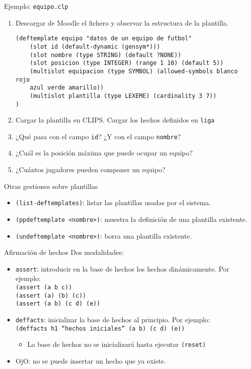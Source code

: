 \documentclass[usenames,dvipsnames,aspectratio=169]{beamer}
\begin{document}
\begin{frame}[fragile]{Ejemplo: \texttt{equipo.clp}}
	\begin{enumerate}
		\item Descargar de Moodle el fichero y observar la estructura de la plantilla.
\begin{verbatim}
(deftemplate equipo "datos de un equipo de futbol"
    (slot id (default-dynamic (gensym*)))
    (slot nombre (type STRING) (default ?NONE))
    (slot posicion (type INTEGER) (range 1 10) (default 5))
    (multislot equipacion (type SYMBOL) (allowed-symbols blanco rojo
    azul verde amarillo))
    (multislot plantilla (type LEXEME) (cardinality 3 7))
)
\end{verbatim}
		\item Cargar la plantilla en CLIPS. Cargar los hechos definidos en \texttt{liga}
		\item ¿Qué pasa con el campo \texttt{id}? ¿Y con el campo \texttt{nombre}?
		\item ¿Cuál es la posición máxima que puede ocupar un equipo?
		\item ¿Cuántos jugadores pueden componer un equipo?
	\end{enumerate}
\end{frame}

\begin{frame}{Otras gestiones sobre plantillas}
	\begin{itemize}
		\item \texttt{(list-deftemplates)}: listar las plantillas usadas por el sistema.
		\item \texttt{(ppdeftemplate <nombre>)}: muestra la definición de una plantilla existente.
		\item \texttt{(undeftemplate <nombre>)}: borra una plantilla existente.
	\end{itemize}
\end{frame}

\begin{frame}{Afirmación de hechos}
	Dos modalidades:
	\begin{itemize}
		\item \texttt{assert}: introducir en la base de hechos los hechos dinámicamente. Por ejemplo:\\
		\texttt{(assert (a b c))}\\
		\texttt{(assert (a) (b) (c))}\\
		\texttt{(assert (a b) (c d) (e))}
		\item \texttt{deffacts}: inicializar la base de hechos al principio. Por ejemplo:\\
		\texttt{(deffacts h1 ``hechos iniciales'' (a b) (c d) (e))}
		\begin{itemize}
			\item La base de hechos no se inicializará hasta ejecutar \texttt{(reset)}
		\end{itemize}
		\item OjO: no se puede insertar un hecho que ya existe.
	\end{itemize}
\end{frame}
\end{document}
